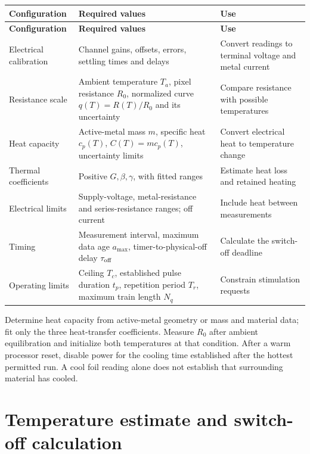 \documentclass[11pt,letterpaper]{article}
\newlength{\TableWidth}
\begin{document}
\begingroup
\small
\setlength{\tabcolsep}{5pt}
\renewcommand{\arraystretch}{1.14}
\setlength{\TableWidth}{\dimexpr\linewidth-4\tabcolsep\relax}
\begin{longtable}{@{}L{0.220\TableWidth}L{0.400\TableWidth}L{0.380\TableWidth}@{}}
\toprule
\textbf{Configuration} & \textbf{Required values} & \textbf{Use} \\
\midrule
\endfirsthead
\toprule
\textbf{Configuration} & \textbf{Required values} & \textbf{Use} \\
\midrule
\endhead
\midrule
\endfoot
\bottomrule
\endlastfoot
Electrical calibration & Channel gains, offsets, errors, settling times and delays & Convert readings to terminal voltage and metal current \\
Resistance scale & Ambient temperature \(T_a\), pixel resistance \(R_0\), normalized curve \(q(T)=R(T)/R_0\) and its uncertainty & Compare resistance with possible temperatures \\
Heat capacity & Active-metal mass \(m\), specific heat \(c_p(T)\), \(C(T)=mc_p(T)\), uncertainty limits & Convert electrical heat to temperature change \\
Thermal coefficients & Positive \(G,\beta,\gamma\), with fitted ranges & Estimate heat loss and retained heating \\
Electrical limits & Supply-voltage, metal-resistance and series-resistance ranges; off current & Include heat between measurements \\
Timing & Measurement interval, maximum data age \(a_{\max}\), timer-to-physical-off delay \(\tau_{\rm off}\) & Calculate the switch-off deadline \\
Operating limits & Ceiling \(T_c\), established pulse duration \(t_p\), repetition period \(T_r\), maximum train length \(N_q\) & Constrain stimulation requests \\
\end{longtable}
\endgroup


Determine heat capacity from active-metal geometry or mass and material data; fit only the three heat-transfer coefficients. Measure \(R_0\) after ambient equilibration and initialize both temperatures at that condition. After a warm processor reset, disable power for the cooling time established after the hottest permitted run. A cool foil reading alone does not establish that surrounding material has cooled.

\section{Temperature estimate and switch-off calculation}
\end{document}
